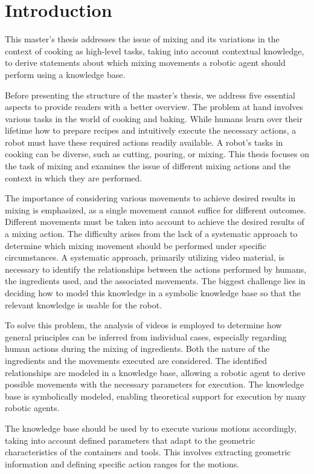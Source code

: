 \chapter{Introduction}
This master's thesis addresses the issue of mixing and its variations in the context of cooking as high-level tasks, taking into account contextual knowledge, to derive statements about which mixing movements a robotic agent should perform using a knowledge base.

Before presenting the structure of the master's thesis, we address five essential aspects to provide readers with a better overview. The problem at hand involves various tasks in the world of cooking and baking. While humans learn over their lifetime how to prepare recipes and intuitively execute the necessary actions, a robot must have these required actions readily available. A robot's tasks in cooking can be diverse, such as cutting, pouring, or mixing. This thesis focuses on the task of mixing and examines the issue of different mixing actions and the context in which they are performed. 

The importance of considering various movements to achieve desired results in mixing is emphasized, as a single movement cannot suffice for different outcomes. Different movements must be taken into account to achieve the desired results of a mixing action. The difficulty arises from the lack of a systematic approach to determine which mixing movement should be performed under specific circumstances. A systematic approach, primarily utilizing video material, is necessary to identify the relationships between the actions performed by humans, the ingredients used, and the associated movements. The biggest challenge lies in deciding how to model this knowledge in a symbolic knowledge base so that the relevant knowledge is usable for the robot.

To solve this problem, the analysis of videos is employed to determine how general principles can be inferred from individual cases, especially regarding human actions during the mixing of ingredients. Both the nature of the ingredients and the movements executed are considered. The identified relationships are modeled in a knowledge base, allowing a robotic agent to derive possible movements with the necessary parameters for execution. The knowledge base is symbolically modeled, enabling theoretical support for execution by many robotic agents.

The knowledge base should be used by     to execute various motions accordingly, taking into account defined parameters that adapt to the geometric characteristics of the containers and tools. 
This involves extracting geometric information and defining specific action ranges for the motions.

